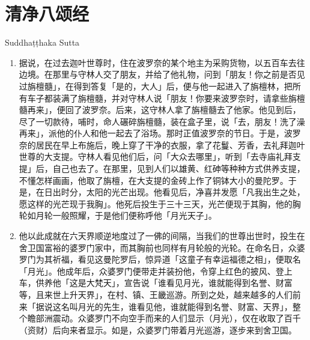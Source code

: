 \section{清净八颂经}

\begin{center}Suddhaṭṭhaka Sutta\end{center}\vspace{1em}

\begin{enumerate}\item 据说，在过去迦叶世尊时，住在波罗奈的某个地主为采购货物，以五百车去往边境。在那里与守林人交了朋友，并给了他礼物，问到「朋友！你之前是否见过旃檀髓」，在得到答复「是的，大人」后，便与他一起进入了旃檀林，把所有车子都装满了旃檀髓，并对守林人说「朋友！你要来波罗奈时，请拿些旃檀髓再来」，便回了波罗奈。后来，这守林人拿了旃檀髓去了他家。他见到后，尽了一切款待，哺时，命人碾碎旃檀髓，装在盒子里，说「去，朋友！洗了澡再来」，派他的仆人和他一起去了浴场。那时正值波罗奈的节日。于是，波罗奈的居民在早上布施后，晚上穿了干净的衣服，拿了花鬘、芳香，去礼拜迦叶世尊的大支提。守林人看见他们后，问「大众去哪里」，听到「去寺庙礼拜支提」后，自己也去了。在那里，见到人们以雄黄、红砷等种种方式供养支提，不懂怎样画画，他取了旃檀，在大支提的金砖上作了铜钵大小的曼陀罗。于是，在日出时分，太阳的光芒出现。他看见后，净喜并发愿「凡我出生之处，愿这样的光芒现于我胸」。他死后投生于三十三天，光芒便现于其胸，他的胸轮如月轮一般照耀，于是他们便称呼他「月光天子」。
\item 他以此成就在六天界顺逆地度过了一佛的间隔，当我们的世尊出世时，投生在舍卫国富裕的婆罗门家中，而其胸前也同样有月轮般的光轮。在命名日，众婆罗门为其祈福，看见这曼陀罗后，惊异道「这童子有幸运福德之相」，便取名「月光」。他成年后，众婆罗门便带走并装扮他，令穿上红色的披风、登上车，供养他「这是大梵天」，宣告说「谁看见月光，谁就能得到名誉、财富等，且来世上升天界」，在村、镇、王畿巡游。所到之处，越来越多的人们前来「据说这名叫月光的先生，谁看见他，谁就能得到名誉、财富、天界」，整个瞻部洲震动。众婆罗门不向空手而来的人们显示（月光），仅在收取了百千（资财）后向来者显示。如是，众婆罗门带着月光巡游，逐步来到舍卫国。

\end{enumerate}
